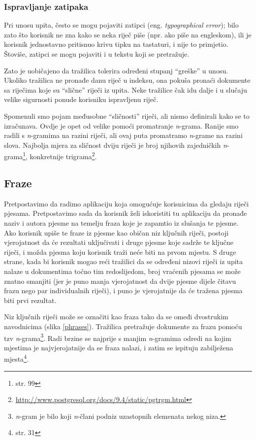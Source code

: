 \documentclass[a4paper,twoside,12pt]{scrreprt}
\begin{document}
\subsubsection{Ispravljanje zatipaka}

Pri unosu upita, često se mogu pojaviti zatipci (eng. \textit{typographical error}); bilo zato što korisnik ne zna kako se neka riječ piše (npr. ako piše na engleskom), ili je korisnik jednostavno pritisnuo krivu tipku na tastaturi, i nije to primjetio. Štoviše, zatipci se mogu pojaviti i u tekstu koji se pretražuje.

Zato je uobičajeno da tražilica tolerira određeni stupanj ``greške'' u unosu. Ukoliko tražilica ne pronađe danu riječ u indeksu, ona pokuša pronaći dokumente sa riječima koje su ``slične'' riječi iz upita. Neke tražilice čak idu dalje i u slučaju velike sigurnosti ponude korisniku ispravljenu riječ.

Spomenuli smo pojam međusobne ``sličnosti'' riječi, ali nismo definirali kako se to izračunava. Ovdje je opet od velike pomoći promatranje \textit{n}-grama. Ranije smo radili s \textit{n}-gramima na razini riječi, ali ovaj puta promatramo \textit{n}-grame na razini slova. Najbolja mjera za sličnost dviju riječi je broj njihovih zajedničkih \textit{n}-grama\footnote{\cite{taming} str. 99}, konkretnije trigrama\footnote{\url{http://www.postgresql.org/docs/9.4/static/pgtrgm.html}}.


\subsection{Fraze}

Pretpostavimo da radimo aplikaciju koja omogućuje korisnicima da gledaju riječi pjesama. Pretpostavimo sada da korisnik želi iskoristiti tu aplikaciju da pronađe naziv i autora pjesme na temelju fraza koje je zapamtio iz slušanja te pjesme. Ako korisnik upiše te fraze iz pjesme kao običan niz ključnih riječi, postoji vjerojatnost da će rezultati uključivati i druge pjesme koje sadrže te ključne riječi, i možda pjesma koju korisnik traži neće biti na prvom mjestu. S druge strane, kada bi korisnik mogao reći tražilici da se određeni nizovi riječi iz upita nalaze u dokumentima točno tim redoslijedom, broj vraćenih pjesama se može znatno smanjiti (jer je puno manja vjerojatnost da dvije pjesme dijele čitavu frazu nego par individualnih riječi), i puno je vjerojatnije da će tražena pjesma biti prvi rezultat.

Niz ključnih riječi može se označiti kao fraza tako da se omeđi dvostrukim navodnicima (slika \ref{phrases}). Tražilica pretražuje dokumente za frazu pomoću tzv \textit{n}-grama\footnote{\textit{n}-gram je bilo koji \textit{n}-člani podniz uzastopnih elemenata nekog niza.}. Radi brzine se najprije s manjim \textit{n}-gramima odredi na kojim mjestima je najvjerojatnije da se fraza nalazi, i zatim se ispituju zabilježena mjesta\footnote{\cite{taming} str. 31}.
\end{document}
